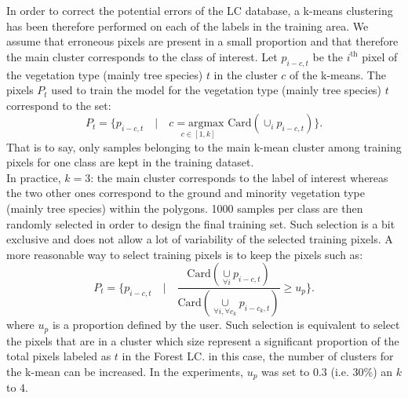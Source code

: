 
In order to correct the potential errors of the LC database, a k-means clustering has been therefore performed on each of the labels in the training area. We assume that erroneous pixels are present in a small proportion and that therefore the main cluster corresponds to the class of interest. Let $p_{i-c,t}$ be the $i^{\text{th}}$ pixel of the vegetation type (mainly tree species) $t$ in the cluster $c$ of the k-means. The pixels $P_{t}$ used to train the model for the vegetation type (mainly tree species) $t$ correspond to the set:
\begin{equation}
P_{t} = \{{p_{i-c,t} \quad | \quad \underset{c \in [1,k]}{c=\text{argmax }}\text{Card} ( \cup_{i} p_{i-c,t} ) } \}.
\end{equation}
That is to say, only samples belonging to the main k-mean cluster among training pixels for one class are kept in the training dataset. \\
In practice, $k=3$: the main cluster corresponds to the label of interest whereas the two other ones correspond to the ground and minority vegetation type (mainly tree species) within the polygons. 1000 samples per class are then randomly selected in order to design the final training set. Such selection is a bit exclusive and does not allow a lot of variability of the selected training pixels. A more reasonable way to select training pixels is to keep the pixels such as:
\begin{equation}
P_{t} = \{p_{i-c,t} \quad | \quad  \frac{\text{Card}\left(\underset{\forall i}{\cup} p_{i-c,t}\right)}{\text{Card}\left(\underset{\forall i, \forall c_{k}}{\cup} p_{i-c_{k},t}\right)} \geq u_{p}\}.
\end{equation}
where $u_{p}$ is a proportion defined by the user.
Such selection is equivalent to select the pixels that are in a cluster which size represent a significant proportion of the total pixels labeled as $t$ in the Forest LC. in this case, the number of clusters for the k-mean can be increased. In the experiments, $u_{p}$ was set to $0.3$ (i.e. 30\%) an $k$ to $4$.

